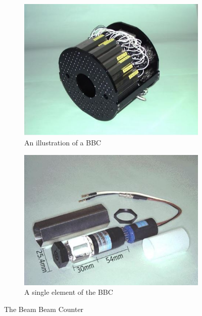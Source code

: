 \begin{figure}
\centering
\begin{subfigure}[b]{0.4\textwidth}
    \centering
    \includegraphics[width=\textwidth]{Figures/bbcrender.JPG}
    \caption{An illustration of a BBC}
\end{subfigure}
\begin{subfigure}[b]{0.4\textwidth}
    \centering
    \includegraphics[width=\textwidth]{Figures/bbcsinglechannel.JPG}
    \caption{A single element of the BBC}

\end{subfigure}
\caption[The Beam Beam Counter]{The Beam Beam Counter}
    \label{fig:BBCillustrations}
\end{figure}


